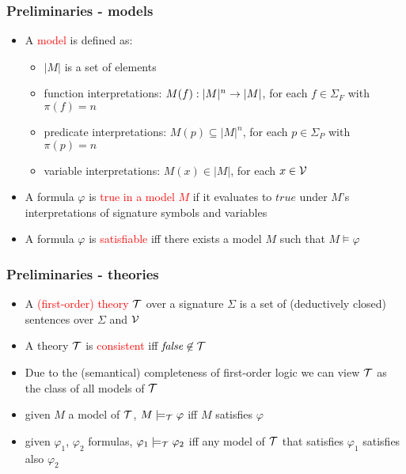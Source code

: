 \documentclass[smaller]{beamer}
\def\cT{{\cal T}}
\def\cV{{\cal V}}
\newcommand{\red}[1]{\textcolor{red}{#1}}
\begin{document}
\begin{frame}
\frametitle{Preliminaries - models}
\begin{itemize}
	\setlength\itemsep{2mm}
\item A \red{model} is defined as:
\vspace{2mm}
	\begin{itemize}
	\setlength\itemsep{2mm}
		\item $|M|$ is a set of elements
		\item function interpretations: $M(f):|M|^n\rightarrow |M|$, for each $f\in\Sigma_F$ with $\pi(f)=n$
		\item predicate interpretations: $M(p)\subseteq |M|^n$, for each $p\in\Sigma_P$ with $\pi(p)=n$
		\item variable interpretations: $M(x)\in |M|$, for each $x\in\cV$
	\end{itemize}
\item A formula $\varphi$ is \red{true in a model $M$} if it evaluates to $true$ under $M$'s interpretations of signature symbols and variables
\item A formula $\varphi$ is \red{satisfiable} iff there exists a model $M$ such that $M\models \varphi$
\end{itemize}
\end{frame}

\begin{frame}
\frametitle{Preliminaries - theories}
\begin{itemize}
\setlength\itemsep{2mm}
\item A \red{(first-order) theory} $\cT$ over a signature $\Sigma$ is a set of (deductively closed)
sentences over $\Sigma$ and $\cV$
\item A theory $\cT$ is \red{consistent} iff $\mathit{false}\not\in \cT$
\item Due to the (semantical) completeness of first-order logic we can view $\cT$ as the class of all models of $\cT$
\item given $M$ a model of $\cT$, \red{$M\models_\cT \varphi$} iff $M$ satisfies $\varphi$
\item given $\varphi_1$, $\varphi_2$ formulas, \red{$\varphi_1\models_\cT\varphi_2$} iff any model of $\cT$ that satisfies $\varphi_1$ satisfies also $\varphi_2$
\end{itemize}
\end{frame}
\end{document}
